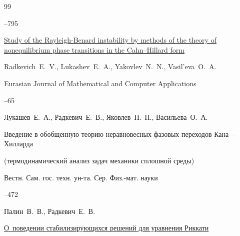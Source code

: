 \begin{thebibliography}{99}



--795





\paper  	\href{http://mi.mathnet.ru/ejmca18 }{Study of the Rayleigh-Benard instability by methods of the theory of nonequilibrium phase transitions in the Cahn--Hillard form}

\by Radkevich~E.~V.,  Lukashev~E.~A., Yakovlev~N.~N., Vasil'eva~O.~A.

\jour Eurasian Journal of Mathematical and Computer Applications




–65






\by Лукашев~Е.~А., Радкевич~Е.~В., Яковлев~Н.~Н., Васильева~О.~А.

\paper Введение в обобщенную теорию неравновесных фазовых переходов Кана—Хилларда

(термодинамический анализ задач механики сплошной среды)

\jour Вестн. Сам. гос. техн. ун-та. Сер. Физ.-мат. науки




--472










\by Палин~В.~В., Радкевич~Е.~В.

\paper \href{{http://mi.mathnet.ru/tsp92}}{О~поведении стабилизирующихся решений для уравнения Риккати}


\end{thebibliography}
